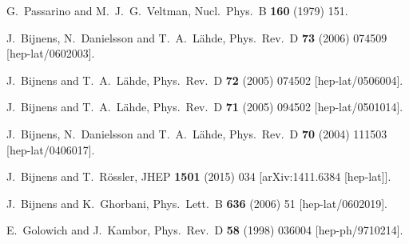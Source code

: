 \documentclass[12pt,a4paper]{article}
\begin{document}
\begin{thebibliography}{99}
  G.~Passarino and M.~J.~G.~Veltman,
  Nucl.\ Phys.\ B {\bf 160} (1979) 151.

  J.~Bijnens, N.~Danielsson and T.~A.~L\"ahde,
  Phys.\ Rev.\ D {\bf 73} (2006) 074509
  [hep-lat/0602003].

  J.~Bijnens and T.~A.~L\"ahde,
  Phys.\ Rev.\ D {\bf 72} (2005) 074502
  [hep-lat/0506004].

  J.~Bijnens and T.~A.~L\"ahde,
  Phys.\ Rev.\ D {\bf 71} (2005) 094502
  [hep-lat/0501014].

  J.~Bijnens, N.~Danielsson and T.~A.~L\"ahde,
  Phys.\ Rev.\ D {\bf 70} (2004) 111503
  [hep-lat/0406017].

  J.~Bijnens and T.~Rössler,
  JHEP {\bf 1501} (2015) 034
  [arXiv:1411.6384 [hep-lat]].

  J.~Bijnens and K.~Ghorbani,
  Phys.\ Lett.\ B {\bf 636} (2006) 51
  [hep-lat/0602019].

  E.~Golowich and J.~Kambor,
  Phys.\ Rev.\ D {\bf 58} (1998) 036004
  [hep-ph/9710214].


\end{thebibliography}
\end{document}
